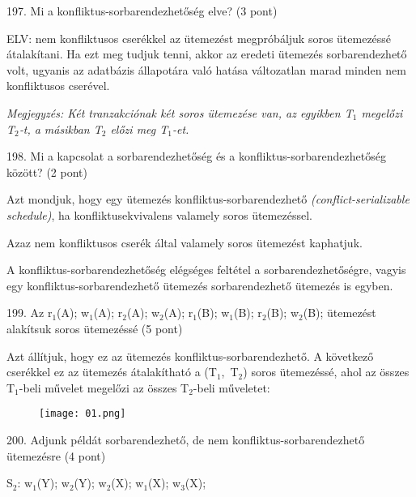 \documentclass[a4paper,11.5pt, table]{article}
\begin{document}
197. Mi a konfliktus-sorbarendezhetőség elve? (3 pont)
	\begin{compactitem}
		\item ELV: nem konfliktusos cserékkel az ütemezést megpróbáljuk soros ütemezéssé átalakítani. Ha ezt meg tudjuk tenni, akkor az eredeti ütemezés sorbarendezhető volt, ugyanis az adatbázis állapotára való hatása változatlan marad minden nem konfliktusos cserével.
		\item \textit{Megjegyzés: Két tranzakciónak két soros ütemezése van, az egyikben T$ _{1} $ megelőzi T$ _{2} $‑t, a másikban T$ _{2} $ előzi meg T$ _{1} $-et.}
	\end{compactitem}

198. Mi a kapcsolat a sorbarendezhetőség és a konfliktus-sorbarendezhetőség között? (2 pont)
	\begin{compactitem}
		\item Azt mondjuk, hogy egy ütemezés konfliktus-sorbarendezhető \textit{(conflict-serializable schedule)}, ha konfliktusekvivalens valamely soros ütemezéssel. 
		\begin{compactitem}
			\item Azaz nem konfliktusos cserék által valamely soros ütemezést kaphatjuk.
		\end{compactitem}
		
		\item A konfliktus-sorbarendezhetőség elégséges feltétel a sorbarendezhetőségre, vagyis egy konfliktus-sorbarendezhető ütemezés sorbarendezhető ütemezés is egyben. 
	\end{compactitem}

199. Az r$ _{1} $(A); w$ _{1} $(A); r$ _{2} $(A); w$ _{2} $(A); r$ _{1} $(B); w$ _{1} $(B); r$ _{2} $(B); w$ _{2} $(B); ütemezést alakítsuk soros ütemezéssé (5 pont)
	\begin{compactitem}
		\item Azt állítjuk, hogy ez az ütemezés konfliktus-sorbarendezhető. A következő cserékkel ez az ütemezés átalakítható a (T$ _{1} $, T$ _{2} $) soros ütemezéssé, ahol az összes T$ _{1} $-beli művelet megelőzi az összes T$ _{2} $-beli műveletet:
	\end{compactitem}
\begin{figure}[h]
	\centering
	\texttt{[image: 01.png]}
\end{figure}

200. Adjunk példát sorbarendezhető, de nem konfliktus-sorbarendezhető ütemezésre (4 pont)
	\begin{compactitem}
		\item S$ _{2} $: w$ _{1} $(Y); w$ _{2} $(Y); w$ _{2} $(X); w$ _{1} $(X); w$ _{3} $(X);
	\end{compactitem}
\end{document}
